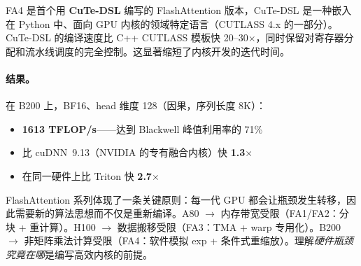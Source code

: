 \begin{keybox}
FA4 是首个用 \textbf{CuTe-DSL} 编写的 FlashAttention 版本，CuTe-DSL 是一种嵌入在 Python 中、面向 GPU 内核的领域特定语言（CUTLASS 4.x 的一部分）。CuTe-DSL 的编译速度比 C++ CUTLASS 模板快 20--30$\times$，同时保留对寄存器分配和流水线调度的完全控制。这显著缩短了内核开发的迭代时间。
\end{keybox}

\paragraph{结果。}
\label{results.}

在 B200 上，BF16、head 维度 128（因果，序列长度 8K）：

\begin{itemize}
  \item \textbf{1613 TFLOP/s}——达到 Blackwell 峰值利用率的 71\%
  \item 比 cuDNN~9.13（NVIDIA 的专有融合内核）快 \textbf{1.3$\times$}
  \item 在同一硬件上比 Triton 快 \textbf{2.7$\times$}
\end{itemize}

\begin{intuitionbox}[软硬件协同演化]
FlashAttention 系列体现了一条关键原则：每一代 GPU 都会让瓶颈发生转移，因此需要新的算法思想而不仅是重新编译。A80 $\to$ 内存带宽受限（FA1/FA2：分块 + 重计算）。H100 $\to$ 数据搬移受限（FA3：TMA + warp 专用化）。B200 $\to$ 非矩阵乘法计算受限（FA4：软件模拟 exp + 条件式重缩放）。理解\emph{硬件瓶颈究竟在哪}是编写高效内核的前提。
\end{intuitionbox}

